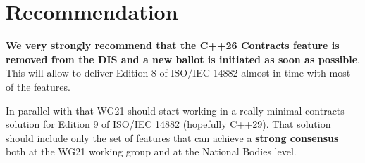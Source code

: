 \section{Recommendation}

\textbf{We very strongly recommend that the C++26 Contracts feature is removed
from the DIS and a new ballot is initiated as soon as possible}. This will allow
to deliver Edition 8 of ISO/IEC 14882 almost in time with most of the features.

In parallel with that WG21 should start working in a really minimal contracts
solution for Edition 9 of ISO/IEC 14882 (hopefully C++29). That solution should
include only the set of features that can achieve a \textbf{strong consensus}
both at the WG21 working group and at the National Bodies level.

